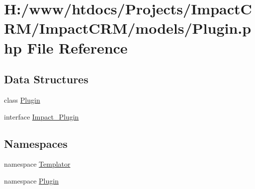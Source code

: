 \hypertarget{Plugin_8php}{
\section{H:/www/htdocs/Projects/ImpactCRM/ImpactCRM/models/Plugin.php File Reference}
\label{Plugin_8php}
}
\subsection*{Data Structures}
\begin{DoxyCompactItemize}
\item 
class \hyperlink{classPlugin}{Plugin}
\item 
interface \hyperlink{interfaceImpact__Plugin}{Impact\_\-Plugin}
\end{DoxyCompactItemize}
\subsection*{Namespaces}
\begin{DoxyCompactItemize}
\item 
namespace \hyperlink{namespaceTemplator}{Templator}
\item 
namespace \hyperlink{namespacePlugin}{Plugin}
\end{DoxyCompactItemize}
